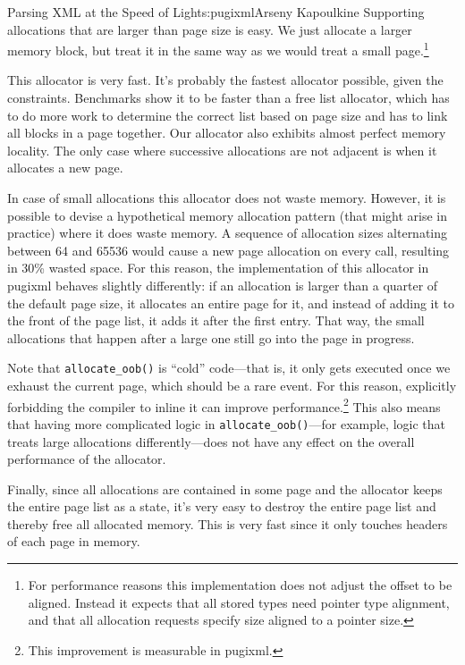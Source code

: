 \begin{aosachapter}{Parsing XML at the Speed of Light}{s:pugixml}{Arseny Kapoulkine}
Supporting allocations that are larger than page size is easy. We just
allocate a larger memory block, but treat it in the same way as we would
treat a small page.\footnote{For performance reasons this implementation
  does not adjust the offset to be aligned. Instead it expects that all
  stored types need pointer type alignment, and that all allocation
  requests specify size aligned to a pointer size.}

This allocator is very fast. It's probably the fastest allocator
possible, given the constraints. Benchmarks show it to be faster than a
free list allocator, which has to do more work to determine the correct
list based on page size and has to link all blocks in a page together.
Our allocator also exhibits almost perfect memory locality. The only
case where successive allocations are not adjacent is when it allocates
a new page.

In case of small allocations this allocator does not waste memory.
However, it is possible to devise a hypothetical memory allocation
pattern (that might arise in practice) where it does waste memory. A
sequence of allocation sizes alternating between 64 and 65536 would
cause a new page allocation on every call, resulting in 30\% wasted
space. For this reason, the implementation of this allocator in pugixml
behaves slightly differently: if an allocation is larger than a quarter
of the default page size, it allocates an entire page for it, and
instead of adding it to the front of the page list, it adds it after the
first entry. That way, the small allocations that happen after a large
one still go into the page in progress.

Note that \texttt{allocate\_oob()} is ``cold'' code---that is, it only
gets executed once we exhaust the current page, which should be a rare
event. For this reason, explicitly forbidding the compiler to inline it
can improve performance.\footnote{This improvement is measurable in
  pugixml.} This also means that having more complicated logic in
\texttt{allocate\_oob()}---for example, logic that treats large
allocations differently---does not have any effect on the overall
performance of the allocator.

Finally, since all allocations are contained in some page and the
allocator keeps the entire page list as a state, it's very easy to
destroy the entire page list and thereby free all allocated memory. This
is very fast since it only touches headers of each page in memory.



\end{aosachapter}
